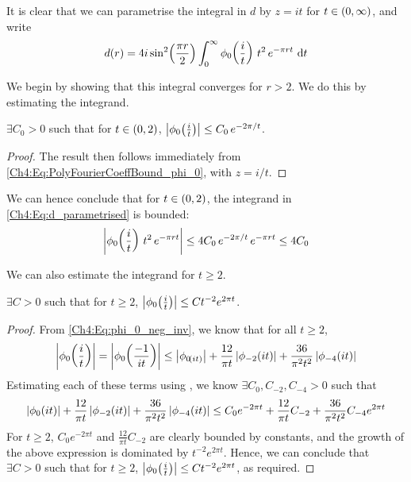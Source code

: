 It is clear that we can parametrise the integral in $d$ by $z = it$ for $t \in \left( 0, \infty \right)$, and write
\begin{align}
    d(r) = 4i \sin^2\!\left( \frac{\pi r}{2} \right) \int_{0}^{\infty} \phi_0\!\left( \frac{i}{t} \right) \, t^2 \, e^{-\pi r t} \, \operatorname{d}\!{t}
    \label{Ch4:Eq:d_parametrised}
\end{align}

We begin by showing that this integral converges for $r > 2$. We do this by estimating the integrand.

\begin{boxlemma}
    $\exists C_0 > 0$ such that for $t \in \left( 0, 2 \right)$, $\left\lvert \phi_0\!\left( \frac{i}{t} \right) \right\rvert \leq C_0 \, e^{-2\pi/t}$.
\end{boxlemma}
\begin{proof}
    The result then follows immediately from \eqref{Ch4:Eq:PolyFourierCoeffBound_phi_0}, with $z = i/t$.
\end{proof}

We can hence conclude that for $t \in \left( 0, 2 \right)$, the integrand in \eqref{Ch4:Eq:d_parametrised} is bounded:
\begin{align*}
    \left\lvert \phi_0\!\left( \frac{i}{t} \right) \, t^2 \, e^{-\pi r t} \right\rvert 
    \leq 4 C_0 \, e^{-2\pi / t} \, e^{-\pi r t}
    \leq 4 C_0
\end{align*}

We can also estimate the integrand for $t \geq 2$.

\begin{boxlemma}\label{Ch4:Lemma:d_integral_estimate_above}
    $\exists C > 0$ such that for $t \geq 2$, $\left\lvert \phi_{0}\!\left( \frac{i}{t} \right) \right\rvert \leq C t^{-2} e^{2\pi t}$.
\end{boxlemma}
\begin{proof}
    From \eqref{Ch4:Eq:phi_0_neg_inv}, we know that for all $t \geq 2$,
    \begin{align*}
        \left\lvert \phi_0\!\left( \frac{i}{t} \right) \right\rvert
        = \left\lvert \phi_{0}\!\left( \frac{-1}{it} \right) \right\rvert
        \leq \left\lvert \phi_{0\!\left( it \right)} \right\rvert + \frac{12}{\pi t} \left\lvert \phi_{-2}\!\left( it \right) \right\rvert + \frac{36}{\pi^2 t^2} \left\lvert \phi_{-4}\!\left( it \right) \right\rvert
    \end{align*}
    Estimating each of these terms using , we know $\exists C_0, C_{-2}, C_{-4} > 0$ such that
    \begin{align*}
        \left\lvert \phi_{0}\!\left( it \right) \right\rvert + \frac{12}{\pi t} \left\lvert \phi_{-2}\!\left( it \right) \right\rvert + \frac{36}{\pi^2 t^2} \left\lvert \phi_{-4}\!\left( it \right) \right\rvert
        \leq C_0 e^{-2 \pi t} + \frac{12}{\pi t} C_{-2} + \frac{36}{\pi^2 t^2} C_{-4} e^{2 \pi t}
    \end{align*}
    For $t \geq 2$, $C_0 e^{-2 \pi t}$ and $\frac{12}{\pi t} C_{-2}$ are clearly bounded by constants, and the growth of the above expression is dominated by $t^{-2} e^{2\pi t}$. Hence, we can conclude that $\exists C > 0$ such that for $t \geq 2$, $\left\lvert \phi_0\!\left( \frac{i}{t} \right) \right\rvert \leq C t^{-2} e^{2 \pi t}$, as required.
\end{proof}

